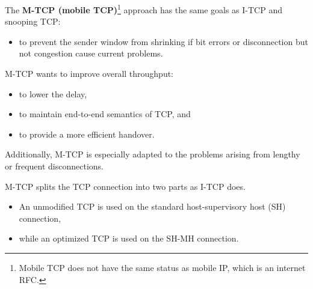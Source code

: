 

The \textbf{M-TCP (mobile TCP)}\footnote{Mobile TCP does not have the same status as mobile IP, which is an internet RFC.} approach has the same goals as I-TCP and snooping TCP: 
\begin{itemize}
	\item to prevent the sender window from shrinking if bit errors or disconnection but not congestion cause current problems.
\end{itemize}

M-TCP wants to improve overall throughput:

\begin{itemize}
	\item to lower the delay, 
	\item to maintain end-to-end semantics of TCP, and 
	\item to provide a more efficient handover. 
\end{itemize}


Additionally, M-TCP is especially adapted to the problems arising from lengthy or frequent disconnections.

M-TCP splits the TCP connection into two parts as I-TCP does. 
\begin{itemize}
	\item An unmodified TCP is used on the standard host-supervisory host (SH) connection, 
	\item while an optimized TCP is used on the SH-MH connection.
\end{itemize}


